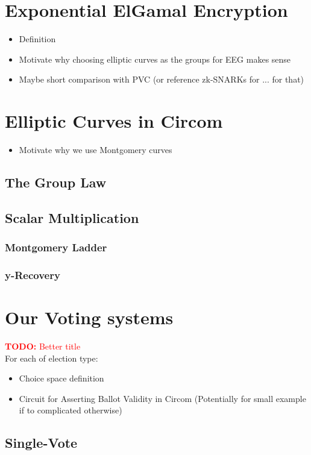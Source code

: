 \documentclass{article}
\newcommand{\todo}[1]{\textcolor{red}{\textbf{TODO:} #1}}
\begin{document}
\section{Exponential ElGamal Encryption}
\begin{itemize}
    \item Definition
    \item Motivate why choosing elliptic curves as the groups for EEG makes sense
    \item Maybe short comparison with PVC (or reference zk-SNARKs for ... for that)
\end{itemize}

\section{Elliptic Curves in Circom}
\begin{itemize}
    \item Motivate why we use Montgomery curves
\end{itemize}
\subsection{The Group Law}
\subsection{Scalar Multiplication}
\subsubsection{Montgomery Ladder}
\subsubsection{y-Recovery}

\section{Our Voting systems}\todo{Better title}\\
For each of election type:
\begin{itemize}
    \item Choice space definition
    \item Circuit for Asserting Ballot Validity in Circom (Potentially for small example if to complicated otherwise)
\end{itemize}
\subsection{Single-Vote}
\end{document}
